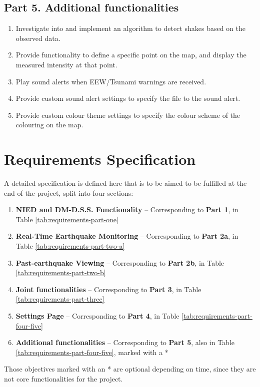 \subsection{Part 5. Additional functionalities}
\begin{enumerate}
    \item Investigate into and implement an algorithm to detect shakes based on the observed data.
    \item Provide functionality to define a specific point on the map, and display the measured intensity at that point.
    \item Play sound alerts when EEW/Tsunami warnings are received.
    \item Provide custom sound alert settings to specify the file to the sound alert.
    \item Provide custom colour theme settings to specify the colour scheme of the colouring on the map.
\end{enumerate}

\section{Requirements Specification}

A detailed specification is defined here that is to be aimed to be fulfilled at the end of the project, split into four sections:
\begin{enumerate}
    \item \textbf{NIED and DM-D.S.S. Functionality} -- Corresponding to \textbf{Part 1}, in Table \ref{tab:requirements-part-one}
    \item \textbf{Real-Time Earthquake Monitoring} -- Corresponding to \textbf{Part 2a}, in Table \ref{tab:requirements-part-two-a}
    \item \textbf{Past-earthquake Viewing} -- Corresponding to \textbf{Part 2b}, in Table \ref{tab:requirements-part-two-b}
    \item \textbf{Joint functionalities} -- Corresponding to \textbf{Part 3}, in Table \ref{tab:requirements-part-three}
    \item \textbf{Settings Page} -- Corresponding to \textbf{Part 4}, in Table \ref{tab:requirements-part-four-five}
    \item \textbf{Additional functionalities} -- Corresponding to \textbf{Part 5}, also in Table \ref{tab:requirements-part-four-five}, marked with a *
\end{enumerate}

Those objectives marked with an * are optional depending on time, since they are not core functionalities for the project.

